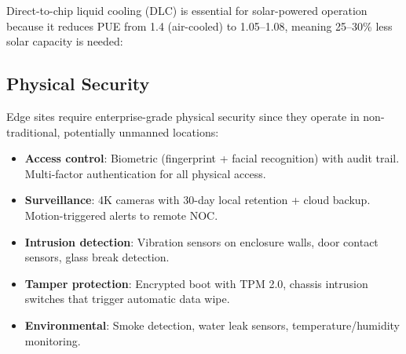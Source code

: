 \documentclass[conference,10pt,letterpaper]{IEEEtran}
\begin{document}
Direct-to-chip liquid cooling (DLC) is essential for solar-powered operation because it reduces PUE from 1.4 (air-cooled) to 1.05--1.08, meaning 25--30\% less solar capacity is needed:

\begin{table}[!t]
\caption{Cooling Architecture by SKU}
\label{tab:cooling}
\centering\scriptsize
{}
\end{table}

\subsection{Physical Security}

Edge sites require enterprise-grade physical security since they operate in non-traditional, potentially unmanned locations:

\begin{itemize}
\item \textbf{Access control}: Biometric (fingerprint + facial recognition) with audit trail. Multi-factor authentication for all physical access.
\item \textbf{Surveillance}: 4K cameras with 30-day local retention + cloud backup. Motion-triggered alerts to remote NOC.
\item \textbf{Intrusion detection}: Vibration sensors on enclosure walls, door contact sensors, glass break detection.
\item \textbf{Tamper protection}: Encrypted boot with TPM 2.0, chassis intrusion switches that trigger automatic data wipe.
\item \textbf{Environmental}: Smoke detection, water leak sensors, temperature/humidity monitoring.
\end{itemize}
\end{document}
